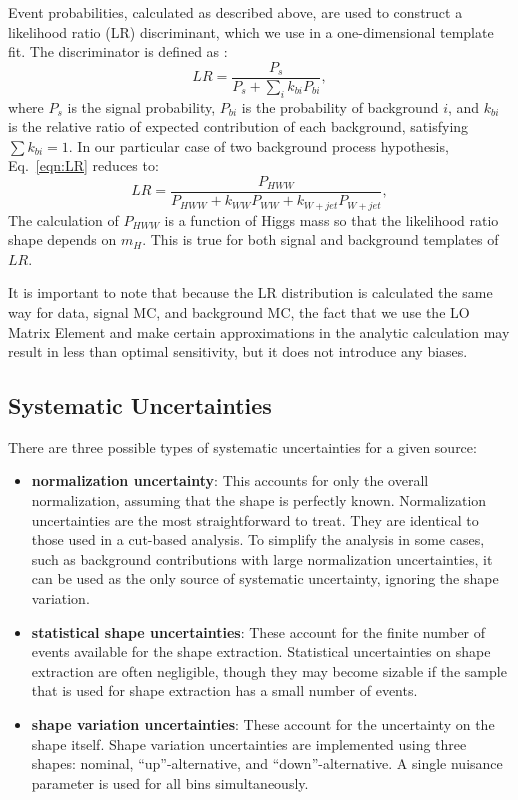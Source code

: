 \documentclass{cmspaper}
\begin{document}
Event probabilities, calculated as described above, are used to construct 
a likelihood ratio (LR) discriminant, which we use in a one-dimensional template fit.  
The discriminator is defined as :
\begin{equation}
\label{eqn:LR}
LR = \frac { P_s} { P_s + \sum_i k_{bi} P_{bi}},
\end{equation}
where $P_s$ is the signal probability, $P_{bi}$ is the probability of background $i$, and 
 $k_{bi}$ is the relative ratio of expected contribution of each background, satisfying $\sum k_{bi} =1$.
In our particular case of two background process hypothesis, Eq.~\ref{eqn:LR} reduces to:
\begin{equation}
\label{eqn:LRHWW}
LR = \frac { P_{HWW}} { P_{HWW} + k_{WW} P_{WW}+k_{W+jet} P_{W+jet}},
\end{equation}
The calculation of $P_{HWW}$ is a function of Higgs mass so that the likelihood ratio
shape depends on $m_H$. This is true for both signal and background templates of $LR$.

It is important to note that because the LR distribution is calculated the same way for data,
signal MC, and background MC, the fact that we use the LO Matrix Element and make certain 
approximations in the analytic calculation may result in less than optimal sensitivity, but
it does not introduce any biases.
                                        
\subsection{Systematic Uncertainties}
There are three possible types of systematic uncertainties for a 
given source:
\begin{itemize}
  \item {\bf normalization uncertainty}:  This accounts for only the overall normalization,
  assuming that the shape is perfectly known.  Normalization uncertainties are the most 
  straightforward to treat. They are identical to those used in a cut-based analysis. 
  To simplify the analysis in some cases, such as background contributions with large 
  normalization uncertainties, it can be used as the only source of systematic uncertainty,
   ignoring the shape variation.

  \item {\bf statistical shape uncertainties}:  These account for the finite number of events
   available for the shape extraction.  Statistical uncertainties on shape extraction are often negligible,
   though they may become sizable if the sample that is used for shape extraction has a small number
   of events.

  \item {\bf shape variation uncertainties}:  These account for the uncertainty on the shape itself.  
  Shape variation uncertainties are implemented using three shapes: nominal, ``up''-alternative,
   and ``down''-alternative. A single nuisance parameter is used for all bins simultaneously.

\end{itemize}
\end{document}
